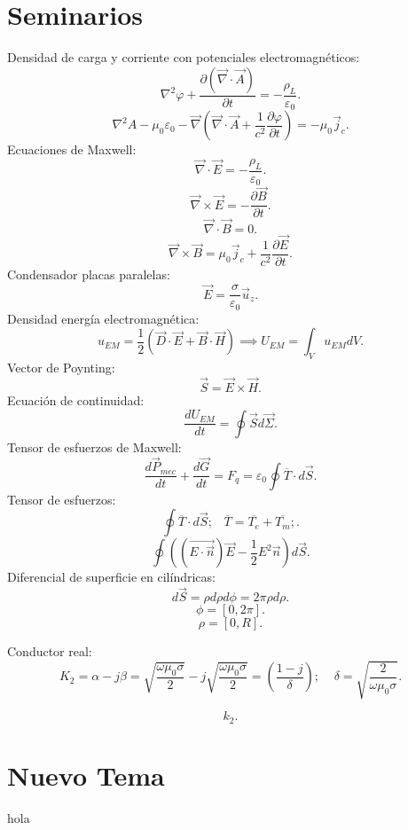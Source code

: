 \section{Seminarios}
\begin{tcolorbox}[enhanced,attach boxed title to top center={yshift=-3mm,yshifttext=-1mm},
colback=blue!5!white,colframe=blue!75!black,colbacktitle=blue!80!black,
title=Boletin 1,fonttitle=\bfseries,
 boxed title style={size=small,colframe=blue!50!black} ]
 Densidad de carga y corriente con potenciales electromagnéticos:
 \[
     \nabla^2\varphi+\frac{\partial \left( \vec{\nabla} \cdot \vec{A} \right)}{\partial t} = - \frac{\rho_L}{\varepsilon_0} 
 .\] 
 \[
     \nabla ^2A-\mu_0\varepsilon_0 - \vec{\nabla }\left( \vec{\nabla }\cdot \vec{A}+ \frac{1}{c^2} \frac{\partial \varphi}{\partial t}  \right) = -\mu_0 \vec{j}_c  
 .\] 
 Ecuaciones de Maxwell:
 \[
     \vec{\nabla }\cdot \vec{E}= -\frac{\rho_L}{\varepsilon_0}
 .\] 
 \[
     \vec{\nabla }\times \vec{E}= - \frac{\partial \vec{B}}{\partial t} 
 .\] 
 \[
 \vec{\nabla }\cdot \vec{B}=0       
 .\] 
 \[
 \vec{\nabla }\times \vec{B}= \mu_0 \vec{j}_c+ \frac{1}{c^2}\frac{\partial \vec{E}}{\partial t} 
 .\] 
 Condensador placas paralelas:
 \[
 \vec{E}= \frac{\sigma}{\varepsilon_0} \vec{u}_z
 .\] 
 Densidad energía electromagnética:
 \[
     u_{EM}= \frac{1}{2}\left( \vec{D}\cdot \vec{E}+\vec{B}\cdot \vec{H} \right) \implies U_{EM}=\int_V u_{EM}dV
 .\] 
 Vector de Poynting:
 \[
 \vec{S}=\vec{E}\times \vec{H}
 .\] 
 Ecuación de continuidad:
 \[
     \frac{d U_{EM}}{dt} = \oint \vec{S}d\vec{\Sigma}
 .\] 
Tensor de esfuerzos de Maxwell:
\[
\frac{d \vec{P}_{mec}}{dt} + \frac{d\vec{G}}{dt} = F_q= \varepsilon_0\oint \overline{T}\cdot d\vec{S}
.\] 
Tensor de esfuerzos:
\[
    \oint \overline{T}\cdot d\vec{S}; \;\;\;\overline{T}=\overline{T_e}+ \overline{T_m};
.\] 
\[
    \oint \left( \left( \vec{E\cdot \vec{n}} \right) \vec{E}-\frac{1}{2}E^2\vec{n} \right) d\vec{S}
.\] 
Diferencial de superficie en cilíndricas:
\[
d\vec{S}= \rho d\rho d\phi = 2\pi \rho d\rho
.\] 
\[
    \phi = [0,2\pi]
.\] 
\[
\rho=[0,R]
.\] 
\end{tcolorbox}

\newpage
\begin{tcolorbox}[enhanced,attach boxed title to top center={yshift=-3mm,yshifttext=-1mm},
colback=blue!5!white,colframe=blue!75!black,colbacktitle=blue!80!black,
title=Boletín 2,fonttitle=\bfseries,
 boxed title style={size=small,colframe=blue!50!black} ]
 Conductor real:
 \[
     K_2=\alpha - j\beta = \sqrt{\frac{\omega \mu_0 \sigma}{2}} - j \sqrt{\frac{\omega \mu_0 \sigma}{2}}= \left( \frac{1-j}{\delta} \right) ; \;\;\;\; \delta= \sqrt{\frac{2}{\omega  \mu_0 \sigma}} 
 .\] 
\end{tcolorbox}
\[
k_2
.\] 

\section{Nuevo Tema}%
\label{sec:Nuevo Tema}
hola 
